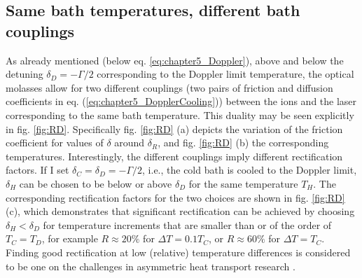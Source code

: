 \subsection{Same bath temperatures, different bath couplings\label{TC}}
%
%
As already mentioned (below eq. \eqref{eq:chapter5_Doppler}), above and below the detuning  $\delta_D=-\Gamma/2$ corresponding to the  Doppler limit temperature, the optical molasses allow for
two different couplings (two pairs of friction and diffusion coefficients in eq. (\ref{eq:chapter5_DopplerCooling})) between the ions and the laser corresponding to the same bath temperature.
This duality may be seen explicitly in fig. \ref{fig:RD}. Specifically fig. \ref{fig:RD} (a) depicts the variation of the friction coefficient for values of $\delta$ around $\delta_R$,  and fig. \ref{fig:RD} (b) the corresponding temperatures.
Interestingly, the different couplings imply different rectification factors.
If I set $\delta_C = \delta_D=-\Gamma / 2$,  i.e., the cold bath is cooled to the Doppler limit, $\delta_H$ can be chosen to be below or above $\delta_D$ for the same temperature $T_H$. The corresponding rectification factors for the two choices
are shown in  fig. \ref{fig:RD} (c),
which
demonstrates that significant rectification can be achieved by choosing $\delta_H<\delta_D$ for temperature increments that
are smaller than or of the order of $T_C=T_D$, for example $R\approx 20\%$ for $\Delta T=0.1 T_C$, or $R\approx 60\%$
for $\Delta T= T_C$.  Finding good rectification at low (relative) temperature differences is considered to be one on the challenges
in asymmetric heat transport research \cite{Zhang2015}.

%
%
%
